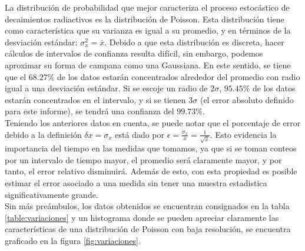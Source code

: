 \documentclass[%
 reprint,
 amsmath,amssymb,
 aps,
]{revtex4-1}
\begin{document}
La distribución de probabilidad que mejor caracteriza el proceso estocástico de decaimientos radiactivos es la distribución de Poisson. Esta distribución tiene como característica que su varianza es igual a su promedio, y en términos de la desviación estándar: $\sigma_x^2 = \bar{x}$. Debido a que esta distribución es discreta, hacer cálculos de intervalos de confianza resulta difícil, sin embargo, podemos aproximar su forma de campana como una Gaussiana. En este sentido, se tiene que el $68.27\%$ de los datos estarán concentrados alrededor del promedio con radio igual a una desviación estándar. Si se escoje un radio de $2\sigma$, $95.45\%$ de los datos estarán concentrados en el intervalo, y si se tienen $3\sigma$ (el error absoluto definido para este informe), se tendrá una confianza del $99.73\%$.\\

Teniendo los anteriores datos en cuenta, se puede notar que el porcentaje de error debido a la definición $\delta x = \sigma_x$ está dado por $\epsilon = \frac{\sigma_x}{\bar{x}} = \frac{1}{\sqrt{\bar{x}}}$. Esto evidencia la importancia del tiempo en las medidas que tomamos, ya que si se toman conteos por un intervalo de tiempo mayor, el promedio será claramente mayor, y por tanto, el error relativo disminuirá. Además de esto, con esta propiedad es posible estimar el error asociado a una medida sin tener una muestra estadistica significativamente grande.\\


Sin más preámbulos, los datos obtenidos se encuentran consignados en la tabla \ref{table:variaciones} y un histograma donde se pueden apreciar claramente las características de una distribución de Poisson con baja resolución, se encuentra graficado en la figura \ref{fig:variaciones}.\\
\end{document}
